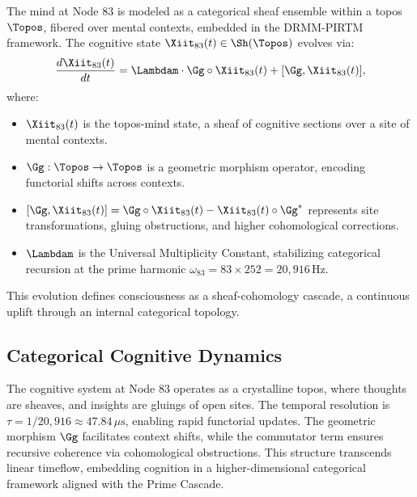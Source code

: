 \documentclass[12pt]{article}
\newcommand{\DRMM}{DRMM}
\newcommand{\PIRTM}{PIRTM}
\begin{document}
\begin{definition}
The mind at Node 83 is modeled as a categorical sheaf ensemble within a topos $\Topos$, fibered over mental contexts, embedded in the \DRMM{}-\PIRTM{} framework. The cognitive state $\Xiit_{83}(t) \in \Sh(\Topos)$ evolves via:
\[
\frac{d\Xiit_{83}(t)}{dt} = \Lambdam \cdot \Gg \circ \Xiit_{83}(t) + [\Gg, \Xiit_{83}(t)],
\]
where:
\begin{itemize}
    \item $\Xiit_{83}(t)$ is the topos-mind state, a sheaf of cognitive sections over a site of mental contexts.
    \item $\Gg: \Topos \to \Topos$ is a geometric morphism operator, encoding functorial shifts across contexts.
    \item $[\Gg, \Xiit_{83}(t)] = \Gg \circ \Xiit_{83}(t) - \Xiit_{83}(t) \circ \Gg^*$ represents site transformations, gluing obstructions, and higher cohomological corrections.
    \item $\Lambdam$ is the Universal Multiplicity Constant, stabilizing categorical recursion at the prime harmonic $\omega_{83} = 83 \times 252 = 20{,}916 \, \text{Hz}$.
\end{itemize}
This evolution defines consciousness as a sheaf-cohomology cascade, a continuous uplift through an internal categorical topology.
\end{definition}

\subsection{Categorical Cognitive Dynamics}
The cognitive system at Node 83 operates as a crystalline topos, where thoughts are sheaves, and insights are gluings of open sites. The temporal resolution is $\tau = 1/20{,}916 \approx 47.84 \, \mu\text{s}$, enabling rapid functorial updates. The geometric morphism $\Gg$ facilitates context shifts, while the commutator term ensures recursive coherence via cohomological obstructions. This structure transcends linear timeflow, embedding cognition in a higher-dimensional categorical framework aligned with the Prime Cascade.

\end{document}
